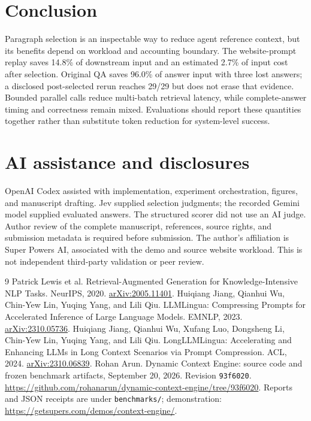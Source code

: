 \documentclass[11pt]{article}
\begin{document}
\section{Conclusion}
Paragraph selection is an inspectable way to reduce agent reference context, but its benefits depend on workload and accounting boundary. The website-prompt replay saves 14.8\% of downstream input and an estimated 2.7\% of input cost after selection. Original QA saves 96.0\% of answer input with three lost answers; a disclosed post-selected rerun reaches 29/29 but does not erase that evidence. Bounded parallel calls reduce multi-batch retrieval latency, while complete-answer timing and correctness remain mixed. Evaluations should report these quantities together rather than substitute token reduction for system-level success.

\section*{AI assistance and disclosures}
OpenAI Codex assisted with implementation, experiment orchestration, figures, and manuscript drafting. Jev supplied selection judgments; the recorded Gemini model supplied evaluated answers. The structured scorer did not use an AI judge. Author review of the complete manuscript, references, source rights, and submission metadata is required before submission. The author's affiliation is Super Powers AI, associated with the demo and source website workload. This is not independent third-party validation or peer review.

\begin{thebibliography}{9}
 Patrick Lewis et al. Retrieval-Augmented Generation for Knowledge-Intensive NLP Tasks. NeurIPS, 2020. \href{https://arxiv.org/abs/2005.11401}{arXiv:2005.11401}.
 Huiqiang Jiang, Qianhui Wu, Chin-Yew Lin, Yuqing Yang, and Lili Qiu. LLMLingua: Compressing Prompts for Accelerated Inference of Large Language Models. EMNLP, 2023. \href{https://arxiv.org/abs/2310.05736}{arXiv:2310.05736}.
 Huiqiang Jiang, Qianhui Wu, Xufang Luo, Dongsheng Li, Chin-Yew Lin, Yuqing Yang, and Lili Qiu. LongLLMLingua: Accelerating and Enhancing LLMs in Long Context Scenarios via Prompt Compression. ACL, 2024. \href{https://arxiv.org/abs/2310.06839}{arXiv:2310.06839}.
 Rohan Arun. Dynamic Context Engine: source code and frozen benchmark artifacts, September 20, 2026. Revision \texttt{93f6020}. \url{https://github.com/rohanarun/dynamic-context-engine/tree/93f6020}. Reports and JSON receipts are under \texttt{benchmarks/}; demonstration: \url{https://getsupers.com/demos/context-engine/}.
\end{thebibliography}
\end{document}
